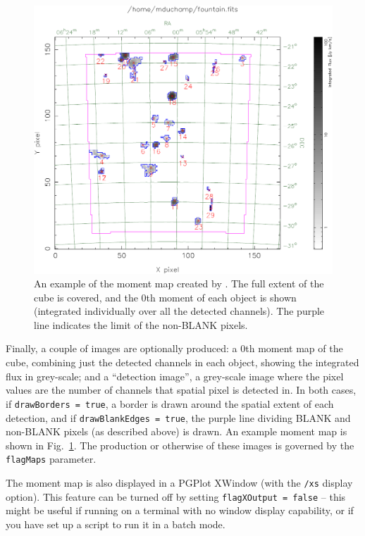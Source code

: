 
\begin{figure}[!t]
\begin{center}
\includegraphics[width=\textwidth]{example_moment_map}
\end{center}
\caption{\footnotesize An example of the moment map created by
  \duchamp. The full extent of the cube is covered, and the 0th moment
  of each object is shown (integrated individually over all the
  detected channels). The purple line indicates the limit of the
  non-BLANK pixels.}
\label{fig-moment}
\end{figure}

Finally, a couple of images are optionally produced: a 0th moment map
of the cube, combining just the detected channels in each object,
showing the integrated flux in grey-scale; and a ``detection image'',
a grey-scale image where the pixel values are the number of channels
that spatial pixel is detected in. In both cases, if
\texttt{drawBorders = true}, a border is drawn around the spatial
extent of each detection, and if \texttt{drawBlankEdges = true}, the
purple line dividing BLANK and non-BLANK pixels (as described above)
is drawn. An example moment map is shown in Fig.~\ref{fig-moment}.
The production or otherwise of these images is governed by the
\texttt{flagMaps} parameter.

The moment map is also displayed in a PGPlot XWindow (with the
\texttt{/xs} display option). This feature can be turned off by
setting \texttt{flagXOutput = false} -- this might be useful if
running \duchamp on a terminal with no window display capability, or
if you have set up a script to run it in a batch mode.

